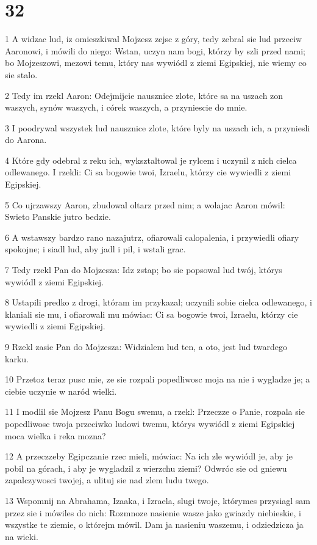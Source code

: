 \chapter{32}

\par 1 A widzac lud, iz omieszkiwal Mojzesz zejsc z góry, tedy zebral sie lud przeciw Aaronowi, i mówili do niego: Wstan, uczyn nam bogi, którzy by szli przed nami; bo Mojzeszowi, mezowi temu, który nas wywiódl z ziemi Egipskiej, nie wiemy co sie stalo.
\par 2 Tedy im rzekl Aaron: Odejmijcie nausznice zlote, które sa na uszach zon waszych, synów waszych, i córek waszych, a przyniescie do mnie.
\par 3 I poodrywal wszystek lud nausznice zlote, które byly na uszach ich, a przyniesli do Aarona.
\par 4 Które gdy odebral z reku ich, wyksztaltowal je rylcem i uczynil z nich cielca odlewanego. I rzekli: Ci sa bogowie twoi, Izraelu, którzy cie wywiedli z ziemi Egipskiej.
\par 5 Co ujrzawszy Aaron, zbudowal oltarz przed nim; a wolajac Aaron mówil: Swieto Panskie jutro bedzie.
\par 6 A wstawszy bardzo rano nazajutrz, ofiarowali calopalenia, i przywiedli ofiary spokojne; i siadl lud, aby jadl i pil, i wstali grac.
\par 7 Tedy rzekl Pan do Mojzesza: Idz zstap; bo sie popsowal lud twój, którys wywiódl z ziemi Egipskiej.
\par 8 Ustapili predko z drogi, któram im przykazal; uczynili sobie cielca odlewanego, i klaniali sie mu, i ofiarowali mu mówiac: Ci sa bogowie twoi, Izraelu, którzy cie wywiedli z ziemi Egipskiej.
\par 9 Rzekl zasie Pan do Mojzesza: Widzialem lud ten, a oto, jest lud twardego karku.
\par 10 Przetoz teraz pusc mie, ze sie rozpali popedliwosc moja na nie i wygladze je; a ciebie uczynie w naród wielki.
\par 11 I modlil sie Mojzesz Panu Bogu swemu, a rzekl: Przeczze o Panie, rozpala sie popedliwosc twoja przeciwko ludowi twemu, którys wywiódl z ziemi Egipskiej moca wielka i reka mozna?
\par 12 A przeczzeby Egipczanie rzec mieli, mówiac: Na ich zle wywiódl je, aby je pobil na górach, i aby je wygladzil z wierzchu ziemi? Odwróc sie od gniewu zapalczywosci twojej, a ulituj sie nad zlem ludu twego.
\par 13 Wspomnij na Abrahama, Izaaka, i Izraela, slugi twoje, którymes przysiagl sam przez sie i mówiles do nich: Rozmnoze nasienie wasze jako gwiazdy niebieskie, i wszystke te ziemie, o którejm mówil. Dam ja nasieniu waszemu, i odziedzicza ja na wieki.

